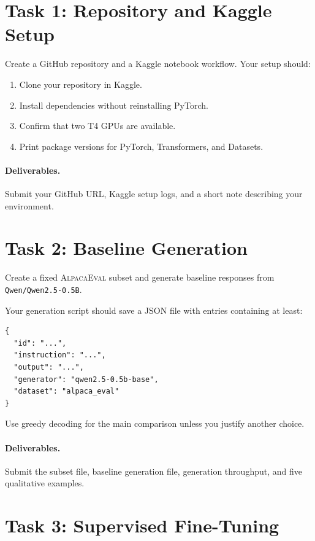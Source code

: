 \documentclass[11pt]{article}
\newcommand{\modelname}{\texttt{Qwen/Qwen2.5-0.5B}}
\newcommand{\alpaca}{\textsc{AlpacaEval}}
\begin{document}
\section{Task 1: Repository and Kaggle Setup}
Create a GitHub repository and a Kaggle notebook workflow. Your setup should:
\begin{enumerate}[leftmargin=*]
  \item Clone your repository in Kaggle.
  \item Install dependencies without reinstalling PyTorch.
  \item Confirm that two T4 GPUs are available.
  \item Print package versions for PyTorch, Transformers, and Datasets.
\end{enumerate}

\paragraph{Deliverables.}
Submit your GitHub URL, Kaggle setup logs, and a short note describing your environment.

\section{Task 2: Baseline Generation}
Create a fixed \alpaca{} subset and generate baseline responses from \modelname{}.

Your generation script should save a JSON file with entries containing at least:
\begin{lstlisting}
{
  "id": "...",
  "instruction": "...",
  "output": "...",
  "generator": "qwen2.5-0.5b-base",
  "dataset": "alpaca_eval"
}
\end{lstlisting}

Use greedy decoding for the main comparison unless you justify another choice.

\paragraph{Deliverables.}
Submit the subset file, baseline generation file, generation throughput, and five qualitative examples.

\section{Task 3: Supervised Fine-Tuning}
\end{document}
